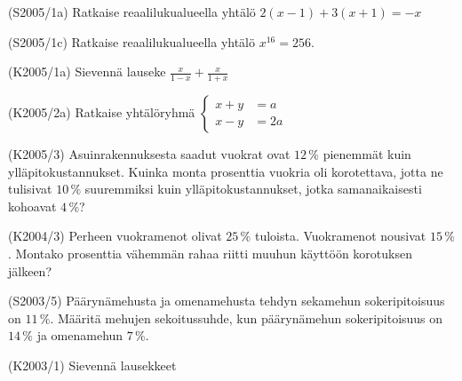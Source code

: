 \begin{tehtava}(S2005/1a) Ratkaise reaalilukualueella yhtälö 
                       $ 2(x - 1) + 3(x + 1 ) = -x $
\end{tehtava}

\begin{tehtava}(S2005/1c) Ratkaise reaalilukualueella yhtälö $ x^{16} = 256 $.
\end{tehtava}

\begin{tehtava}(K2005/1a) Sievennä lauseke
                        $ \frac{x}{1 - x} + \frac{x}{1 + x} $
\end{tehtava}

\begin{tehtava}(K2005/2a) Ratkaise yhtälöryhmä
                      $
                        \left\{
                        \begin{aligned}
                             x + y &= a \\
                             x - y &= 2a
                        \end{aligned}
                        \right.
                    $
\end{tehtava}

\begin{tehtava}(K2005/3) Asuinrakennuksesta saadut vuokrat ovat $12\,\%$ pienemmät kuin ylläpitokustannukset. Kuinka monta prosenttia vuokria oli korotettava, jotta ne tulisivat $10\,\%$ suuremmiksi kuin ylläpitokustannukset, jotka samanaikaisesti kohoavat $4\,\%$?
\end{tehtava}

\begin{tehtava}(K2004/3) Perheen vuokramenot olivat $25\,\%$ tuloista. Vuokramenot nousivat $15\,\%$. Montako prosenttia vähemmän rahaa riitti muuhun käyttöön korotuksen jälkeen?
\end{tehtava}

\begin{tehtava}(S2003/5) Päärynämehusta ja omenamehusta tehdyn sekamehun sokeripitoisuus on $11\,\%$. Määritä mehujen sekoitussuhde, kun päärynämehun sokeripitoisuus on $14\,\%$ ja omenamehun $7\,\%$.
\end{tehtava}


\begin{tehtava}(K2003/1) Sievennä lausekkeet
\end{tehtava}

